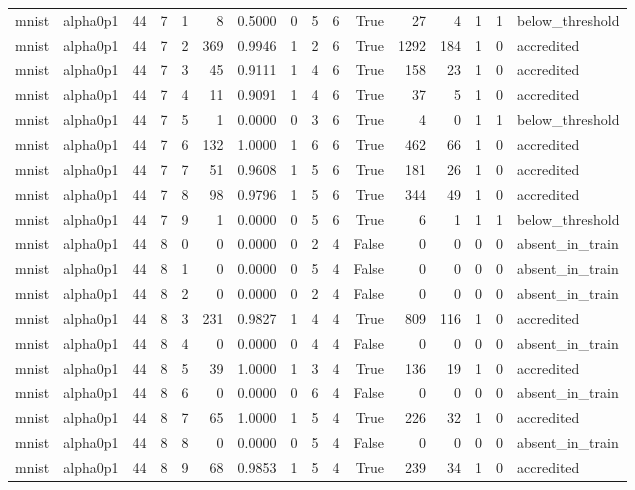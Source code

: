 \begin{tabular}{llrrrrrrrrrrrrrl}
mnist & alpha0p1 & 44 & 7 & 1 & 8 & 0.5000 & 0 & 5 & 6 & True & 27 & 4 & 1 & 1 & below\_threshold \\
mnist & alpha0p1 & 44 & 7 & 2 & 369 & 0.9946 & 1 & 2 & 6 & True & 1292 & 184 & 1 & 0 & accredited \\
mnist & alpha0p1 & 44 & 7 & 3 & 45 & 0.9111 & 1 & 4 & 6 & True & 158 & 23 & 1 & 0 & accredited \\
mnist & alpha0p1 & 44 & 7 & 4 & 11 & 0.9091 & 1 & 4 & 6 & True & 37 & 5 & 1 & 0 & accredited \\
mnist & alpha0p1 & 44 & 7 & 5 & 1 & 0.0000 & 0 & 3 & 6 & True & 4 & 0 & 1 & 1 & below\_threshold \\
mnist & alpha0p1 & 44 & 7 & 6 & 132 & 1.0000 & 1 & 6 & 6 & True & 462 & 66 & 1 & 0 & accredited \\
mnist & alpha0p1 & 44 & 7 & 7 & 51 & 0.9608 & 1 & 5 & 6 & True & 181 & 26 & 1 & 0 & accredited \\
mnist & alpha0p1 & 44 & 7 & 8 & 98 & 0.9796 & 1 & 5 & 6 & True & 344 & 49 & 1 & 0 & accredited \\
mnist & alpha0p1 & 44 & 7 & 9 & 1 & 0.0000 & 0 & 5 & 6 & True & 6 & 1 & 1 & 1 & below\_threshold \\
mnist & alpha0p1 & 44 & 8 & 0 & 0 & 0.0000 & 0 & 2 & 4 & False & 0 & 0 & 0 & 0 & absent\_in\_train \\
mnist & alpha0p1 & 44 & 8 & 1 & 0 & 0.0000 & 0 & 5 & 4 & False & 0 & 0 & 0 & 0 & absent\_in\_train \\
mnist & alpha0p1 & 44 & 8 & 2 & 0 & 0.0000 & 0 & 2 & 4 & False & 0 & 0 & 0 & 0 & absent\_in\_train \\
mnist & alpha0p1 & 44 & 8 & 3 & 231 & 0.9827 & 1 & 4 & 4 & True & 809 & 116 & 1 & 0 & accredited \\
mnist & alpha0p1 & 44 & 8 & 4 & 0 & 0.0000 & 0 & 4 & 4 & False & 0 & 0 & 0 & 0 & absent\_in\_train \\
mnist & alpha0p1 & 44 & 8 & 5 & 39 & 1.0000 & 1 & 3 & 4 & True & 136 & 19 & 1 & 0 & accredited \\
mnist & alpha0p1 & 44 & 8 & 6 & 0 & 0.0000 & 0 & 6 & 4 & False & 0 & 0 & 0 & 0 & absent\_in\_train \\
mnist & alpha0p1 & 44 & 8 & 7 & 65 & 1.0000 & 1 & 5 & 4 & True & 226 & 32 & 1 & 0 & accredited \\
mnist & alpha0p1 & 44 & 8 & 8 & 0 & 0.0000 & 0 & 5 & 4 & False & 0 & 0 & 0 & 0 & absent\_in\_train \\
mnist & alpha0p1 & 44 & 8 & 9 & 68 & 0.9853 & 1 & 5 & 4 & True & 239 & 34 & 1 & 0 & accredited \\

\end{tabular}
